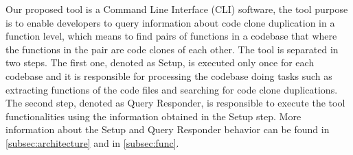 \en

Our proposed tool is a Command Line Interface (CLI) software, the tool purpose is to enable developers to query 
information about code clone duplication in a function level, which means to find pairs of functions in a codebase
that where the functions in the pair are code clones of each other. The tool is separated in two steps. The 
first one, denoted as Setup, is executed only once for each codebase and it is responsible for processing the
codebase doing tasks such as extracting functions of the code files 
and searching for code clone duplications. The second step, denoted as Query Responder, is
responsible to execute the tool functionalities using the information obtained in the Setup step. More information about the 
Setup and Query Responder behavior can be found in \ref{subsec:architecture} and in \ref{subsec:func}. 
